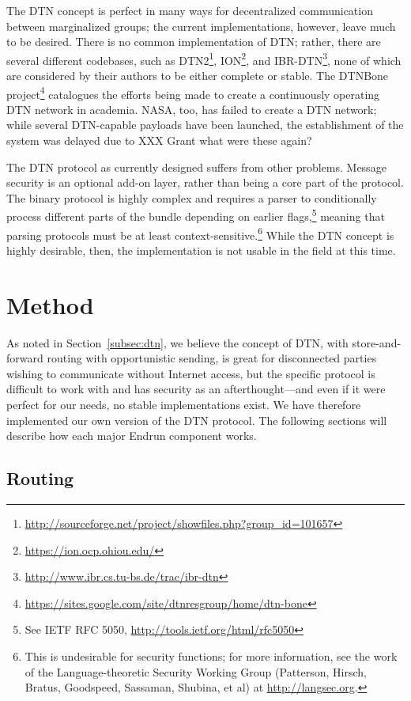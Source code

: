 \documentclass[12pt]{article}
\begin{document}
  The DTN concept is perfect in many ways for decentralized communication between marginalized groups; the current implementations, however, leave much to be desired. There is no common implementation of DTN; rather, there are several different codebases, such as DTN2\footnote{\url{http://sourceforge.net/project/showfiles.php?group_id=101657}}, ION\footnote{\url{https://ion.ocp.ohiou.edu/}}, and IBR-DTN\footnote{\url{http://www.ibr.cs.tu-bs.de/trac/ibr-dtn}}, none of which are considered by their authors to be either complete or stable. The DTNBone project\footnote{\url{https://sites.google.com/site/dtnresgroup/home/dtn-bone}} catalogues the efforts being made to create a continuously operating DTN network in academia. NASA, too, has failed to create a DTN network; while several DTN-capable payloads have been launched, the establishment of the system was delayed due to XXX Grant what were these again?
  
  The DTN protocol as currently designed suffers from other problems. Message security is an optional add-on layer, rather than being a core part of the protocol. The binary protocol is highly complex and requires a parser to conditionally process different parts of the bundle depending on earlier flags,\footnote{See IETF RFC 5050, \url{http://tools.ietf.org/html/rfc5050}} meaning that parsing protocols must be at least context-sensitive.\footnote{This is undesirable for security functions; for more information, see the work of the Language-theoretic Security Working Group (Patterson, Hirsch, Bratus, Goodspeed, Sassaman, Shubina, et al) at \url{http://langsec.org}.} While the DTN concept is highly desirable, then, the implementation is not usable in the field at this time.
  
  \section{Method}
  
  As noted in Section~\ref{subsec:dtn}, we believe the concept of DTN, with store-and-forward routing with opportunistic sending, is great for disconnected parties wishing to communicate without Internet access, but the specific protocol is difficult to work with and has security as an afterthought---and even if it were perfect for our needs, no stable implementations exist. We have therefore implemented our own version of the DTN protocol. The following sections will describe how each major Endrun component works.
  
  \subsection{Routing}
  \label{subsec:routing}
  
\end{document}
